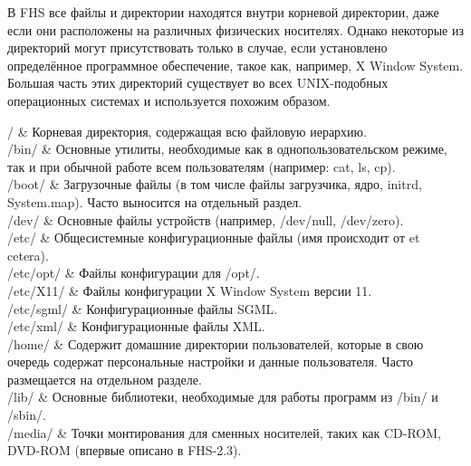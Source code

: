 В FHS все файлы и директории находятся внутри корневой директории, даже если они расположены на различных физических носителях. Однако некоторые из директорий могут присутствовать только в случае, если установлено определённое программное обеспечение, такое как, например, X Window System. Большая часть этих директорий существует во всех UNIX-подобных операционных системах и используется похожим образом.
\begin{center}
/  \&	Корневая директория, содержащая всю файловую иерархию. \\
/bin/ \& 	Основные утилиты, необходимые как в однопользовательском режиме, так и при обычной работе всем пользователям (например: cat, ls, cp). \\
/boot/ \& 	Загрузочные файлы (в том числе файлы загрузчика, ядро, initrd, System.map). Часто выносится на отдельный раздел. \\
/dev/ \&	Основные файлы устройств (например, /dev/null, /dev/zero). \\
/etc/ \&	Общесистемные конфигурационные файлы (имя происходит от et cetera). \\
/etc/opt/ \& Файлы конфигурации для /opt/. \\
/etc/X11/ \& Файлы конфигурации X Window System версии 11. \\
/etc/sgml/ \& Конфигурационные файлы SGML. \\
/etc/xml/ \& Конфигурационные файлы XML. \\
/home/ \& 	Содержит домашние директории пользователей, которые в свою очередь содержат персональные настройки и данные пользователя. Часто размещается на отдельном разделе. \\
/lib/ \&	Основные библиотеки, необходимые для работы программ из /bin/ и /sbin/. \\
/media/ \& 	Точки монтирования для сменных носителей, таких как CD-ROM, DVD-ROM (впервые описано в FHS-2.3). \\

\end{center}
